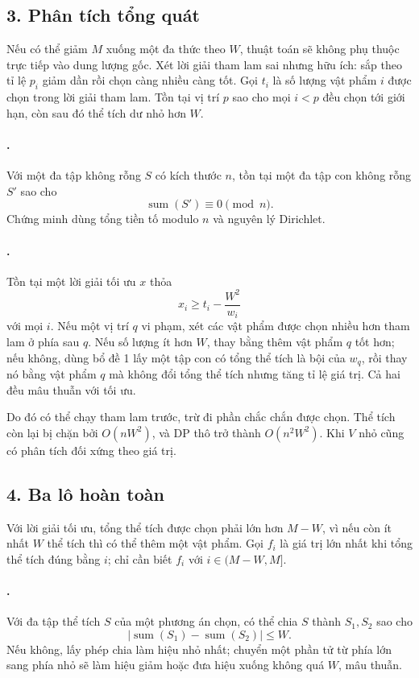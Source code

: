 \documentclass[11pt]{article}
\begin{document}
\subsection*{3. Phân tích tổng quát}

Nếu có thể giảm \(M\) xuống một đa thức theo \(W\), thuật toán sẽ không phụ
thuộc trực tiếp vào dung lượng gốc. Xét lời giải tham lam sai nhưng hữu ích:
sắp theo tỉ lệ \(p_i\) giảm dần rồi chọn càng nhiều càng tốt. Gọi \(t_i\) là
số lượng vật phẩm \(i\) được chọn trong lời giải tham lam. Tồn tại vị trí
\(p\) sao cho mọi \(i<p\) đều chọn tới giới hạn, còn sau đó thể tích dư nhỏ
hơn \(W\).

\paragraph{.}
Với một đa tập không rỗng \(S\) có kích thước \(n\), tồn tại một đa tập con
không rỗng \(S'\) sao cho
\[
  \operatorname{sum}(S')\equiv 0\pmod n.
\]
Chứng minh dùng tổng tiền tố modulo \(n\) và nguyên lý Dirichlet.

\paragraph{.}
Tồn tại một lời giải tối ưu \(x\) thỏa
\[
  x_i\ge t_i-\frac{W^2}{w_i}
\]
với mọi \(i\). Nếu một vị trí \(q\) vi phạm, xét các vật phẩm được chọn nhiều
hơn tham lam ở phía sau \(q\). Nếu số lượng ít hơn \(W\), thay bằng thêm vật
phẩm \(q\) tốt hơn; nếu không, dùng bổ đề 1 lấy một tập con có tổng thể tích là
bội của \(w_q\), rồi thay nó bằng vật phẩm \(q\) mà không đổi tổng thể tích
nhưng tăng tỉ lệ giá trị. Cả hai đều mâu thuẫn với tối ưu.

Do đó có thể chạy tham lam trước, trừ đi phần chắc chắn được chọn. Thể tích
còn lại bị chặn bởi \(O(nW^2)\), và DP thô trở thành \(O(n^2W^2)\). Khi \(V\)
nhỏ cũng có phân tích đối xứng theo giá trị.

\subsection*{4. Ba lô hoàn toàn}

Với lời giải tối ưu, tổng thể tích được chọn phải lớn hơn \(M-W\), vì nếu còn
ít nhất \(W\) thể tích thì có thể thêm một vật phẩm. Gọi \(f_i\) là giá trị lớn
nhất khi tổng thể tích đúng bằng \(i\); chỉ cần biết \(f_i\) với
\(i\in(M-W,M]\).

\paragraph{.}
Với đa tập thể tích \(S\) của một phương án chọn, có thể chia \(S\) thành
\(S_1,S_2\) sao cho
\[
  |\operatorname{sum}(S_1)-\operatorname{sum}(S_2)|\le W.
\]
Nếu không, lấy phép chia làm hiệu nhỏ nhất; chuyển một phần tử từ phía lớn sang
phía nhỏ sẽ làm hiệu giảm hoặc đưa hiệu xuống không quá \(W\), mâu thuẫn.
\end{document}
